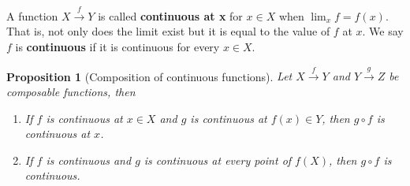 \documentclass[12pt]{amsart}
\newtheorem{proposition}[theorem]{Proposition}
\numberwithin{equation}{section}
\newcommand{\tof}[1]{\stackrel{#1}{\rightarrow}}
\newcommand{\Tof}[1]{\stackrel{#1}{\!\longrightarrow\!}}
\begin{document}
A function $X\tof{f}Y$ is called \textbf{continuous at x} for $x\in X$ when $\lim_x f = f(x)$.  That is, not only does the limit exist but it is equal to the value of $f$ at $x$.  We say $f$ is \textbf{continuous} if it is continuous for every $x\in X$.  
\begin{proposition}[Composition of continuous functions] Let $X\Tof{f}Y$ and $Y\Tof{g} Z$ be composable functions, then  
\begin{enumerate}
\item If $f$ is continuous at $x\in X$ and $g$ is continuous at $f(x)\in Y$, then $g\circ f$ is continuous at $x$.
\item If $f$ is continuous and $g$ is continuous at every point of $f(X)$, then $g\circ f$ is continuous.
\end{enumerate}
\end{proposition}
\end{document}
